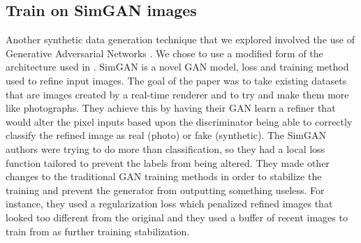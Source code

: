 \documentclass[10pt,twocolumn,letterpaper]{article}
\begin{document}
\subsection{Train on SimGAN images}

Another synthetic data generation technique that we explored involved the use of Generative Adversarial Networks \cite{2014arXiv1409.7495G}.  We chose to use a modified form of the architecture used in \cite{DBLP:journals/corr/ShrivastavaPTSW16}.   SimGAN is a novel GAN\cite{goodfellow} model, loss and training method used to refine input images.  The goal of the paper was to take existing datasets that are images created by a real-time renderer and to try and make them more like photographs. They achieve this by having their GAN learn a refiner that would alter the pixel inputs based upon the discriminator being able to correctly classify the refined image as real (photo) or fake (synthetic).  The SimGAN authors were trying to do more than classification, so they had a local loss function tailored to prevent the labels from being altered.  They made other changes to the traditional GAN training methods in order to stabilize the training and prevent the generator from outputting something useless.  For instance, they used a regularization loss which penalized refined images that looked too different from the original and they used a buffer of recent images to train from as further training stabilization.\\
\end{document}
